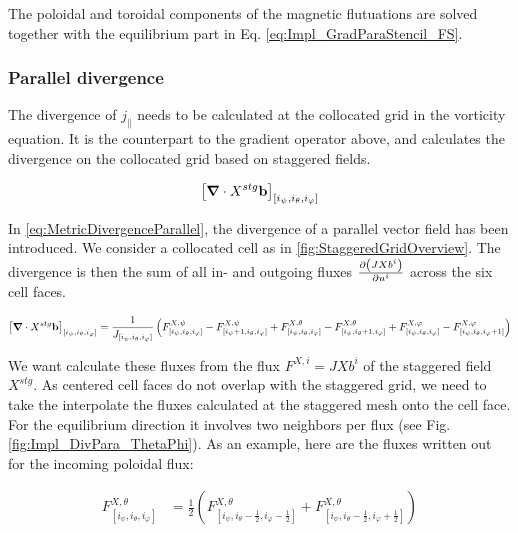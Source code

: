 The poloidal and toroidal components of the magnetic flutuations are solved together with the equilibrium part in Eq. \ref{eq:Impl_GradParaStencil_FS}.


\subsubsection{Parallel divergence}

The divergence of $j_\parallel$ needs to be calculated at the collocated grid in the vorticity equation. It is the counterpart to the gradient operator above, and calculates the divergence on the collocated grid based on staggered fields. 

\begin{equation}
	\left[\grad\cdot X^{stg}\mathbf{b}\right]_{[i_\psi,i_\theta, i_\varphi]}
\end{equation}

In \autoref{eq:MetricDivergenceParallel}, the divergence of a parallel vector field has been introduced. We consider a collocated cell as in \autoref{fig:StaggeredGridOverview}. The divergence is then the sum of all in- and outgoing fluxes $\pdv{\left(J X b^i\right)}{u^i}$ across the six cell faces. 

\begin{equation}
	\label{eq:NumericalStaggeredDivergenceStencil}
	\left[\grad\cdot X^{stg}\mathbf{b}\right]_{[i_\psi,i_\theta, i_\varphi]} = \frac{1}{J_{[i_\psi,i_\theta, i_\varphi]}} \left(F_{[i_\psi,i_\theta, i_\varphi]}^{X,\psi}-F_{[i_\psi+1,i_\theta, i_\varphi]}^{X,\psi} + F_{[i_\psi,i_\theta, i_\varphi]}^{X,\theta}-F_{[i_\psi,i_\theta+1, i_\varphi]}^{X,\theta}+F_{[i_\psi,i_\theta, i_\varphi]}^{X,\varphi}-F_{[i_\psi,i_\theta, i_\varphi+1]}^{X,\varphi}\right)
\end{equation}

We want calculate these fluxes from the flux $F^{X,i} = JXb^i$ of the staggered field $X^{stg}$. As centered cell faces do not overlap with the staggered grid, we need to take the interpolate the fluxes calculated at the staggered mesh onto the cell face. For the equilibrium direction it involves two neighbors per flux (see Fig. \ref{fig:Impl_DivPara_ThetaPhi}). As an example, here are the fluxes written out for the incoming poloidal flux:

\begin{align*}
	F_{[i_\psi,i_\theta, i_\varphi]}^{X,\theta} &= \frac{1}{2}\left(F_{[i_\psi,i_\theta-\frac{1}{2}, i_\varphi-\frac{1}{2}]}^{X,\theta} + F_{[i_\psi,i_\theta-\frac{1}{2}, i_\varphi+\frac{1}{2}]}^{X,\theta} \right)
\end{align*}

